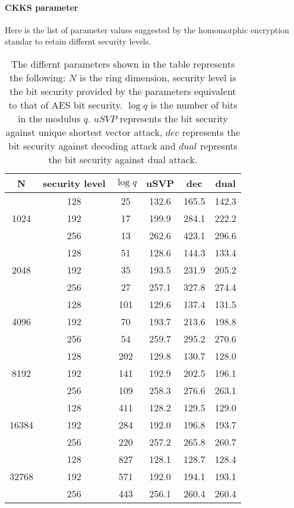 \documentclass[a4paper,10pt]{article}
\begin{document}
\newpage
\paragraph{CKKS parameter} Here is the list of parameter values suggested by the homomorphic encryption standar to retain differnt security levels.




\begin{center}
\begin{table}[h]
\begin{tabular}{|c|c|c|c|c|c|}
\hline
N  &  security level & $\log q$ &  uSVP & dec & dual  \\
\hline
\multirow{3}{4em}{1024} & 128 & 25 & 132.6 & 165.5 & 142.3 \\
& 192 & 17 & 199.9 & 284.1 & 222.2 \\
& 256 & 13 & 262.6 & 423.1 & 296.6 \\
\hline
\multirow{3}{4em}{2048} & 128 & 51 & 128.6 & 144.3 & 133.4 	\\
& 192 & 35 & 193.5 & 231.9 & 205.2 \\
& 256 & 27 & 257.1 & 327.8 & 274.4 \\
\hline
\multirow{3}{4em}{4096} & 128 & 101 & 129.6 & 137.4 & 131.5  \\
& 192 & 70 & 193.7 & 213.6 & 198.8 \\
& 256 & 54 & 259.7 & 295.2 & 270.6 \\
\hline
\multirow{3}{4em}{8192} & 128 & 202 & 129.8 & 130.7 & 128.0\\
& 192 & 141 & 192.9 & 202.5 & 196.1\\
& 256 & 109 & 258.3 & 276.6 & 263.1\\
\hline
\multirow{3}{4em}{16384} & 128 & 411 & 128.2 & 129.5 & 129.0\\
& 192 & 284 & 192.0 & 196.8 & 193.7\\
& 256 & 220 & 257.2 & 265.8 & 260.7\\
\hline
\multirow{3}{4em}{32768} & 128 & 827 & 128.1 & 128.7 & 128.4\\
& 192 & 571 & 192.0 & 194.1 & 193.1\\
& 256 & 443 & 256.1 & 260.4 & 260.4\\
\hline

\end{tabular}
\caption{The differnt parameters shown in the table represents the following: $N$ is the ring dimension, security level is the bit security provided by the parameters equivalent to that of AES bit security. $\log q$ is the number of bits in the modulus $q$. $uSVP$ represents the bit security against unique shortest vector attack, $dec$ represents the bit security against decoding attack and $dual$ represnts the bit security against dual attack.}
\end{table}
\end{center}
\end{document}
